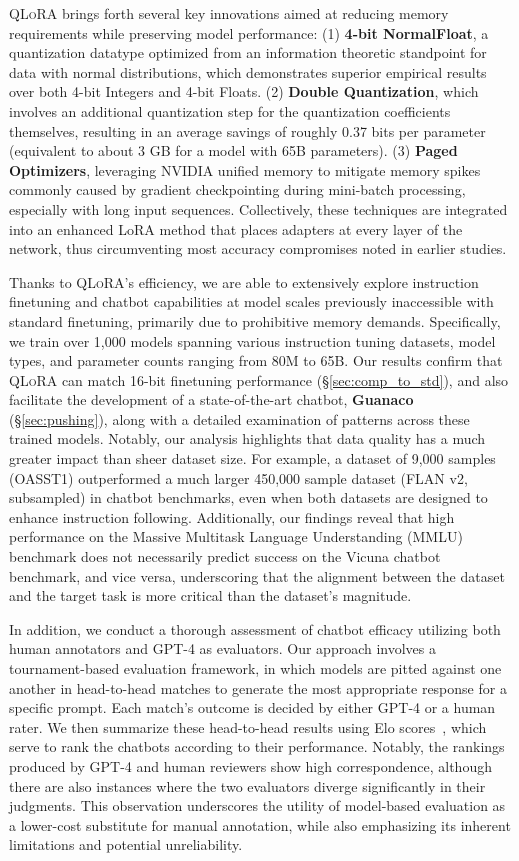 \textsc{QLoRA} brings forth several key innovations aimed at reducing memory requirements while preserving model performance: (1) \textbf{4-bit NormalFloat}, a quantization datatype optimized from an information theoretic standpoint for data with normal distributions, which demonstrates superior empirical results over both 4-bit Integers and 4-bit Floats. (2) \textbf{Double Quantization}, which involves an additional quantization step for the quantization coefficients themselves, resulting in an average savings of roughly 0.37 bits per parameter (equivalent to about 3 GB for a model with 65B parameters). (3) \textbf{Paged Optimizers}, leveraging NVIDIA unified memory to mitigate memory spikes commonly caused by gradient checkpointing during mini-batch processing, especially with long input sequences. Collectively, these techniques are integrated into an enhanced LoRA method that places adapters at every layer of the network, thus circumventing most accuracy compromises noted in earlier studies.

Thanks to \textsc{QLoRA}'s efficiency, we are able to extensively explore instruction finetuning and chatbot capabilities at model scales previously inaccessible with standard finetuning, primarily due to prohibitive memory demands. Specifically, we train over 1,000 models spanning various instruction tuning datasets, model types, and parameter counts ranging from 80M to 65B. Our results confirm that \textsc{QLoRA} can match 16-bit finetuning performance (\S\ref{sec:comp_to_std}), and also facilitate the development of a state-of-the-art chatbot, \textbf{Guanaco} (\S\ref{sec:pushing}), along with a detailed examination of patterns across these trained models. Notably, our analysis highlights that data quality has a much greater impact than sheer dataset size. For example, a dataset of 9,000 samples (OASST1) outperformed a much larger 450,000 sample dataset (FLAN v2, subsampled) in chatbot benchmarks, even when both datasets are designed to enhance instruction following. Additionally, our findings reveal that high performance on the Massive Multitask Language Understanding (MMLU) benchmark does not necessarily predict success on the Vicuna chatbot benchmark, and vice versa, underscoring that the alignment between the dataset and the target task is more critical than the dataset's magnitude.

In addition, we conduct a thorough assessment of chatbot efficacy utilizing both human annotators and GPT-4 as evaluators. Our approach involves a tournament-based evaluation framework, in which models are pitted against one another in head-to-head matches to generate the most appropriate response for a specific prompt. Each match's outcome is decided by either GPT-4 or a human rater. We then summarize these head-to-head results using Elo scores~\citep{elo1967proposed, elo1978rating}, which serve to rank the chatbots according to their performance. Notably, the rankings produced by GPT-4 and human reviewers show high correspondence, although there are also instances where the two evaluators diverge significantly in their judgments. This observation underscores the utility of model-based evaluation as a lower-cost substitute for manual annotation, while also emphasizing its inherent limitations and potential unreliability.

